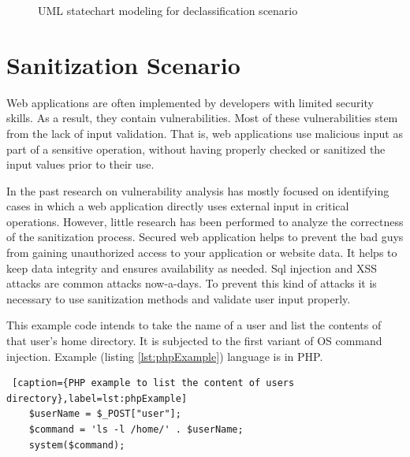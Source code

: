 \begin{figure}[htbp]
	\centering
	\label{fig:declassification_scenario}
	\caption{UML statechart modeling for declassification scenario}
\end{figure}


\section{Sanitization Scenario}
Web applications are often implemented by developers with limited security skills. As a result, they
contain vulnerabilities. Most of these vulnerabilities stem
from the lack of input validation. That is, web applications
use malicious input as part of a sensitive operation, without having properly checked or sanitized the input values
prior to their use.

In the past research on vulnerability analysis has mostly focused on identifying cases in which a web application directly uses external input in critical operations. However,
little research has been performed to analyze the correctness of the sanitization process. Secured web application helps to prevent the bad guys from gaining unauthorized access to your application or website data. It helps to keep data integrity and ensures availability as needed. Sql injection and XSS attacks are common attacks now-a-days. To prevent this kind of attacks it is necessary to use sanitization methods and validate user input properly.

This example code intends to take the name of a user and list the contents of that user's home directory. It is subjected to the first variant of OS command injection. Example (listing \ref{lst:phpExample}) language is in PHP.

\begin{lstlisting} [caption={PHP example to list the content of users directory},label=lst:phpExample]
	$userName = $_POST["user"];
	$command = 'ls -l /home/' . $userName;
	system($command);
\end{lstlisting} 

